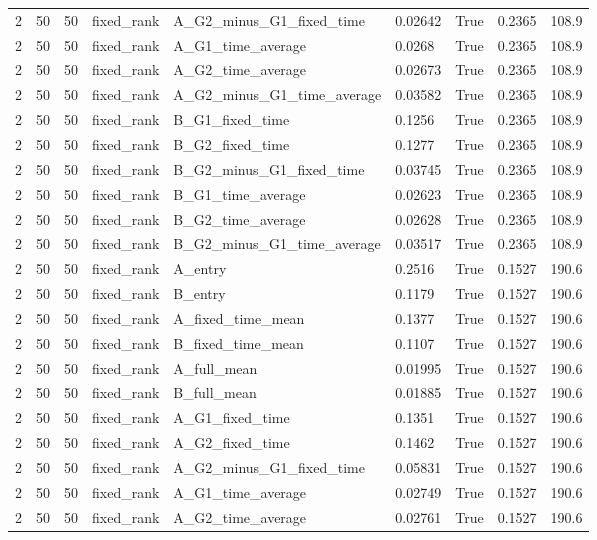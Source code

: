 \begin{longtable}{lllllllll}
2 & 50 & 50 & fixed\_rank & A\_G2\_minus\_G1\_fixed\_time & 0.02642 & True & 0.2365 & 108.9 \\
2 & 50 & 50 & fixed\_rank & A\_G1\_time\_average & 0.0268 & True & 0.2365 & 108.9 \\
2 & 50 & 50 & fixed\_rank & A\_G2\_time\_average & 0.02673 & True & 0.2365 & 108.9 \\
2 & 50 & 50 & fixed\_rank & A\_G2\_minus\_G1\_time\_average & 0.03582 & True & 0.2365 & 108.9 \\
2 & 50 & 50 & fixed\_rank & B\_G1\_fixed\_time & 0.1256 & True & 0.2365 & 108.9 \\
2 & 50 & 50 & fixed\_rank & B\_G2\_fixed\_time & 0.1277 & True & 0.2365 & 108.9 \\
2 & 50 & 50 & fixed\_rank & B\_G2\_minus\_G1\_fixed\_time & 0.03745 & True & 0.2365 & 108.9 \\
2 & 50 & 50 & fixed\_rank & B\_G1\_time\_average & 0.02623 & True & 0.2365 & 108.9 \\
2 & 50 & 50 & fixed\_rank & B\_G2\_time\_average & 0.02628 & True & 0.2365 & 108.9 \\
2 & 50 & 50 & fixed\_rank & B\_G2\_minus\_G1\_time\_average & 0.03517 & True & 0.2365 & 108.9 \\
2 & 50 & 50 & fixed\_rank & A\_entry & 0.2516 & True & 0.1527 & 190.6 \\
2 & 50 & 50 & fixed\_rank & B\_entry & 0.1179 & True & 0.1527 & 190.6 \\
2 & 50 & 50 & fixed\_rank & A\_fixed\_time\_mean & 0.1377 & True & 0.1527 & 190.6 \\
2 & 50 & 50 & fixed\_rank & B\_fixed\_time\_mean & 0.1107 & True & 0.1527 & 190.6 \\
2 & 50 & 50 & fixed\_rank & A\_full\_mean & 0.01995 & True & 0.1527 & 190.6 \\
2 & 50 & 50 & fixed\_rank & B\_full\_mean & 0.01885 & True & 0.1527 & 190.6 \\
2 & 50 & 50 & fixed\_rank & A\_G1\_fixed\_time & 0.1351 & True & 0.1527 & 190.6 \\
2 & 50 & 50 & fixed\_rank & A\_G2\_fixed\_time & 0.1462 & True & 0.1527 & 190.6 \\
2 & 50 & 50 & fixed\_rank & A\_G2\_minus\_G1\_fixed\_time & 0.05831 & True & 0.1527 & 190.6 \\
2 & 50 & 50 & fixed\_rank & A\_G1\_time\_average & 0.02749 & True & 0.1527 & 190.6 \\
2 & 50 & 50 & fixed\_rank & A\_G2\_time\_average & 0.02761 & True & 0.1527 & 190.6 \\

\end{longtable}
